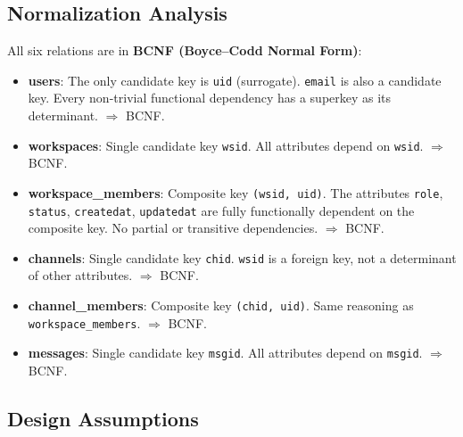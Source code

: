 \documentclass[11pt]{article}
\begin{document}
\subsection{Normalization Analysis}

All six relations are in \textbf{BCNF (Boyce--Codd Normal Form)}:

\begin{itemize}
    \item \textbf{users}: The only candidate key is \texttt{uid} (surrogate). \texttt{email} is also a candidate key. Every non-trivial functional dependency has a superkey as its determinant. $\Rightarrow$ BCNF.
    \item \textbf{workspaces}: Single candidate key \texttt{wsid}. All attributes depend on \texttt{wsid}. $\Rightarrow$ BCNF.
    \item \textbf{workspace\_members}: Composite key \texttt{(wsid, uid)}. The attributes \texttt{role}, \texttt{status}, \texttt{createdat}, \texttt{updatedat} are fully functionally dependent on the composite key. No partial or transitive dependencies. $\Rightarrow$ BCNF.
    \item \textbf{channels}: Single candidate key \texttt{chid}. \texttt{wsid} is a foreign key, not a determinant of other attributes. $\Rightarrow$ BCNF.
    \item \textbf{channel\_members}: Composite key \texttt{(chid, uid)}. Same reasoning as \texttt{workspace\_members}. $\Rightarrow$ BCNF.
    \item \textbf{messages}: Single candidate key \texttt{msgid}. All attributes depend on \texttt{msgid}. $\Rightarrow$ BCNF.
\end{itemize}


\subsection{Design Assumptions}
\end{document}
